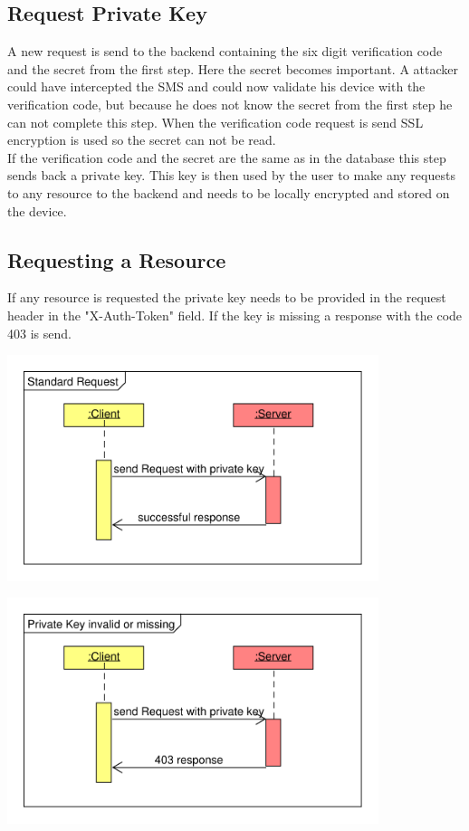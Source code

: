 \subsection{Request Private Key}
A new request is send to the backend containing the six digit verification code and the secret from the first step. Here the secret becomes important. A attacker could have intercepted the SMS and could now validate his device with the verification code, but because he does not know the secret from the first step he can not complete this step. When the verification code request is send SSL encryption is used so the secret can not be read.\\
If the verification code and the secret are the same as in the database this step sends back a private key. This key is then used by the user to make any requests to any resource to the backend and needs to be locally encrypted and stored on the device.

\subsection{Requesting a Resource}
If any resource is requested the private key needs to be provided in the request header in the "X-Auth-Token" field. If the key is missing a response with the code 403 is send.

\begin{center}
\includegraphics[height=6.6cm]{figures/SuccessfulRequest.pdf}
\end{center}

\begin{center}
\includegraphics[height=6.6cm]{figures/UnsuccessfulRequest.pdf}
\end{center}
